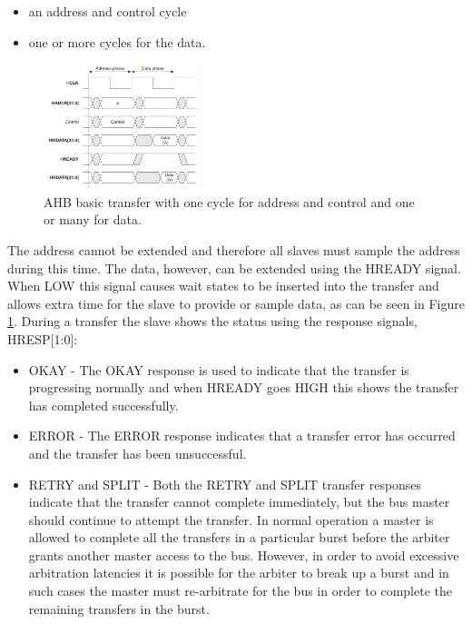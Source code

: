 \begin{itemize}
\item an address and control cycle
\item one or more cycles for the data.
\end{itemize}

\begin{figure}[ht]
    \centering
    \includegraphics[width=0.4\textwidth]{figures/others/simple_ahb_transfer.png}
    \caption{AHB basic transfer with one cycle for address and control and one or many for data.}
    \label{fig:basic_ahb_transfer}
\end{figure}


The address cannot be extended and therefore all slaves must sample the address during this time. The data, however, can be extended using the HREADY signal. When LOW this signal causes wait states to be inserted into the transfer and allows extra time for the slave to provide or sample data, as can be seen in Figure \ref{fig:basic_ahb_transfer}. During a transfer the slave shows the status using the response signals, HRESP[1:0]:
\begin{itemize}

\item  {OKAY -} The OKAY response is used to indicate that the transfer is progressing normally and when HREADY goes HIGH this shows the transfer has completed successfully.
\item {ERROR -} The ERROR response indicates that a transfer error has occurred and the transfer has been unsuccessful.
\item {RETRY and SPLIT  -} Both the RETRY and SPLIT transfer responses indicate that the transfer cannot complete immediately, but the bus master should continue to attempt the transfer. In normal operation a master is allowed to complete all the transfers in a particular burst before the arbiter grants another master access to the bus. However, in order to avoid excessive arbitration latencies it is possible for the arbiter to break up a burst and in such cases the master must re-arbitrate for the bus in order to complete the remaining transfers in the burst.
\end{itemize}


